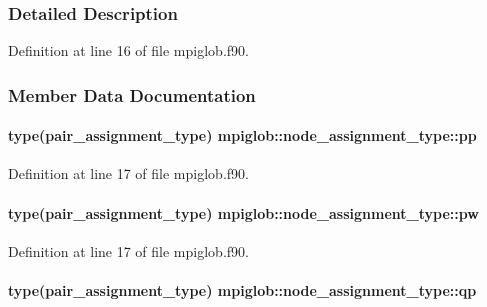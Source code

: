 \subsubsection{Detailed Description}


Definition at line 16 of file mpiglob.\-f90.



\subsubsection{Member Data Documentation}
\hypertarget{structmpiglob_1_1node__assignment__type_a6892e03b2c3c46f6fcd517331f799e4c}{
\paragraph[{pp}]{\setlength{\rightskip}{0pt plus 5cm}type({\bf pair\-\_\-assignment\-\_\-type}) mpiglob\-::node\-\_\-assignment\-\_\-type\-::pp}}\label{structmpiglob_1_1node__assignment__type_a6892e03b2c3c46f6fcd517331f799e4c}


Definition at line 17 of file mpiglob.\-f90.

\hypertarget{structmpiglob_1_1node__assignment__type_a781729388587601056d9b96338f618be}{
\paragraph[{pw}]{\setlength{\rightskip}{0pt plus 5cm}type({\bf pair\-\_\-assignment\-\_\-type}) mpiglob\-::node\-\_\-assignment\-\_\-type\-::pw}}\label{structmpiglob_1_1node__assignment__type_a781729388587601056d9b96338f618be}


Definition at line 17 of file mpiglob.\-f90.

\hypertarget{structmpiglob_1_1node__assignment__type_a705b532835302bf4055b0405f6dc8461}{
\paragraph[{qp}]{\setlength{\rightskip}{0pt plus 5cm}type({\bf pair\-\_\-assignment\-\_\-type}) mpiglob\-::node\-\_\-assignment\-\_\-type\-::qp}}\label{structmpiglob_1_1node__assignment__type_a705b532835302bf4055b0405f6dc8461}


